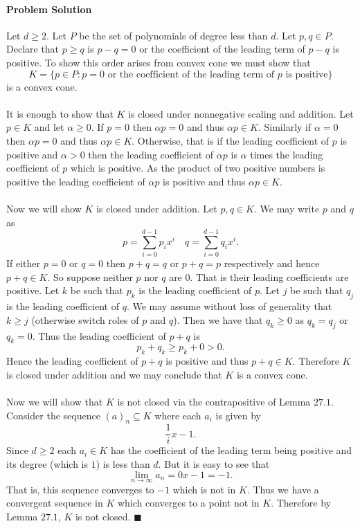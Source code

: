 \documentclass[letterpaper,12pt,oneside,onecolumn]{article}
\begin{document}
\paragraph{Problem Solution}
Let $d \geq 2$. Let $P$ be the set of polynomials of degree less than $d$. Let $p,q \in P$. Declare that $p \geq q$ is $p-q = 0$ or the coefficient of the leading term of $p-q$ is positive. To show this order arises from convex cone we must show that $$K = \{p \in P : p=0 \text{ or the coefficient of the leading term of $p$ is positive}\}$$
is a convex cone.
\paragraph{}
It is enough to show that $K$ is closed under nonnegative scaling and addition. Let $p \in K$ and let $\alpha \geq 0$. If $p = 0$ then $\alpha p = 0$ and thus $\alpha p \in K$. Similarly if $\alpha = 0$ then $\alpha p = 0$ and thus $\alpha p \in K$. Otherwise, that is if the leading coefficient of $p$ is positive and $\alpha > 0$ then the leading coefficient of $\alpha p$ is $\alpha$ times the leading coefficient of $p$ which is positive. As the product of two positive numbers is positive the leading coefficient of $\alpha p$ is positive and thus $\alpha p \in K$.
\paragraph{}
Now we will show $K$ is closed under addition. Let $p, q \in K$. We may write $p$ and $q$ as
$$p = \sum_{i=0}^{d-1}p_i x^i \quad q = \sum_{i=0}^{d-1} q_i x^i.$$
If either $p=0$ or $q=0$ then $p+q=q$ or $p+q = p$ respectively and hence $p+q \in K$. So suppose neither $p$ nor $q$ are $0$. That is their leading coefficients are positive. Let $k$ be such that $p_k$ is the leading coefficient of $p$. Let $j$ be such that $q_j$ is the leading coefficient of $q$. We may assume without loss of generality that $k \geq j$ (otherwise switch roles of $p$ and $q$). Then we have that $q_k \geq 0$ as $q_k=q_j$ or $q_k = 0$. Thus the leading coefficient of $p+q$ is $$p_k + q_k \geq p_k + 0 > 0.$$
Hence the leading coefficient of $p+q$ is positive and thus $p+q \in K$. Therefore $K$ is closed under addition and we may conclude that $K$ is a convex cone.
\paragraph{}
Now we will show that $K$ is not closed via the contrapositive of Lemma $27.1$. Consider the sequence $(a)_n \subseteq K$ where each $a_i$ is given by
$$\frac{1}{i}x - 1.$$
Since $d \geq 2$ each $a_i \in K$ has the coefficient of the leading term being positive and its degree (which is $1$) is less than $d$. But it is easy to see that
$$ \lim_{n \rightarrow \infty} a_n = 0x -1 = -1.$$
That is, this sequence converges to $-1$ which is not in $K$. Thus we have a convergent sequence in $K$ which converges to a point not in $K$. Therefore by Lemma $27.1$, $K$ is not closed. $\blacksquare$
\end{document}
